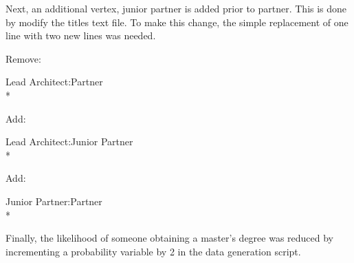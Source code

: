 \noindent Next, an additional vertex, junior partner is added prior to partner. 
This is done by modify the titles text file.  To make this change, the simple
replacement of one line with two new lines was needed.
	
	\begin{footnotesize}
	\indent Remove: \begin{tt}Lead Architect:Partner\\*\end{tt}
	\indent Add: \begin{tt}Lead Architect:Junior Partner\\*\end{tt}
	\indent Add: \begin{tt}Junior Partner:Partner\\*\end{tt}
	\end{footnotesize}
	
\noindent Finally, the likelihood of someone obtaining a master's degree was
reduced by incrementing a probability variable by 2 in the data generation
script.



\usetikzlibrary{shapes,arrows,chains}

